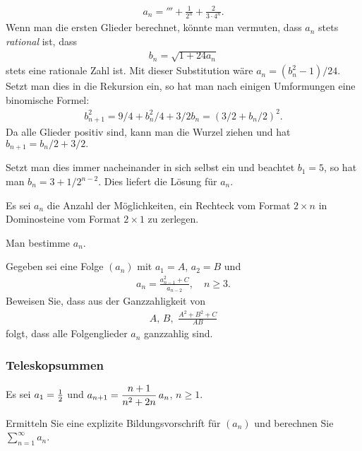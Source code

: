 \documentclass[11pt,a4paper]{article}
\begin{document}
\begin{loesung} 
\begin{gather*}
a_n=\third +\frac{1}{2^n} +\frac{2}{3\cdot 4^n}.
\end{gather*}
Wenn man die ersten Glieder berechnet, könnte man vermuten, dass $a_n$ stets
\emph{rational} ist, dass
\begin{gather*}
b_n= \sqrt{1 +24 a_n}
\end{gather*}
stets eine rationale Zahl ist. Mit dieser Substitution wäre $a_n = (b_n^2
-1)/24$. Setzt man dies in die Rekursion ein, so hat man nach einigen
Umformungen eine binomische Formel:
\begin{gather*}
b_{n+1}^2  = 9/4 + b_n^2/4  +3/2 b_n = (3/2 +b_n/2)^2. 
\end{gather*} 
Da alle Glieder positiv sind, kann man die Wurzel ziehen und hat $b_{n+1} =
b_n/2 + 3/2.$

Setzt man dies immer nacheinander in sich selbst ein und beachtet $b_1 =5$, so
hat man $b_n=3 + 1/2^{n-2}.$ Dies liefert die Lösung für $a_n$.
\end{loesung}

\begin{aufgabe}
Es sei $a_n$ die Anzahl der Möglichkeiten, ein Rechteck vom Format $2\times n$
in Dominosteine vom Format $2\times 1$ zu zerlegen.

Man bestimme $a_n$.
\end{aufgabe}

\begin{aufgabe} Gegeben sei eine Folge $(a_n)$ mit $a_1=A$, $a_2=B$ und
\begin{gather*}
  a_n=\frac{a_{n-1}^2 +C}{a_{n-2}},\quad n\ge 3.
\end{gather*}
Beweisen Sie, dass aus der Ganzzahligkeit von
\begin{gather*}
  A, \, B,\,\,\frac{A^2 +B^2 +C}{AB}
\end{gather*}
folgt, dass alle Folgenglieder $a_n$ ganzzahlig sind.
\end{aufgabe}

\subsubsection*{Teleskopsummen}

\begin{aufgabe} 
Es sei $a_1= \frac{1}{2} $ und $\displaystyle a_{n+1} =\frac{n+1}{n^2 +2n} \,a_{n}$, $n\ge 1$.

Ermitteln Sie eine explizite Bildungsvorschrift für $(a_n)$ und berechnen Sie
$\sum_{n=1}^\infty a_n$.
\end{aufgabe}
\end{document}
